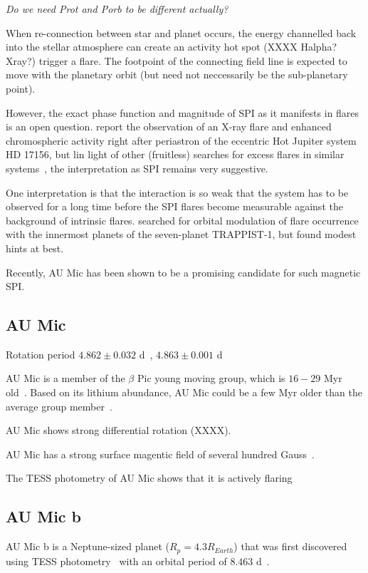 \documentclass[fleqn,usenatbib,letters]{mnras}%
\begin{document}
\textit{Do we need Prot and Porb to be different actually?}

When re-connection between star and planet occurs, the energy channelled back into the stellar atmosphere can create an activity hot spot (XXXX Halpha? Xray?) trigger a flare. The footpoint of the connecting field line is expected to move with the planetary orbit (but need not neccessarily be the sub-planetary point).



However, the exact phase function and magnitude of SPI as it manifests in flares is an open question. \citet{maggio2015} report the observation of an X-ray flare and enhanced chromospheric activity right after periastron of the eccentric Hot Jupiter system HD 17156, but lin light of other (fruitless) searches for excess flares in similar systems~\citep{figueira2016}, the interpretation as SPI remains very suggestive. 

One interpretation is that the interaction is so weak that the system has to be observed for a long time before the SPI flares become measurable against the background of intrinsic flares. \citet{fischer2019} searched for orbital modulation of flare occurrence with the innermost planets of the seven-planet TRAPPIST-1, but found modest hints at best. 

Recently, AU Mic has been shown to be a promising candidate for such magnetic SPI. 


\subsection{AU Mic}
Rotation period $4.862\pm 0.032$ d~\citep{martioli2021}, $4.863\pm 0.001$ d~\citep{plavchan2020}

AU Mic is a member of the $\beta$ Pic young moving group, which is $16-29$ Myr old~\citep{malo2014,binks2014,mamajek2014,bell2015,binks2016,shkolnik2017,miretroig2020}. Based on its lithium abundance, AU Mic could be a few Myr older than the average group member~\citep{malo2014}. 

AU Mic shows strong differential rotation (XXXX).

AU Mic has a strong surface magentic field of several hundred Gauss~\citep{klein2021}.

The TESS photometry of AU Mic shows that it is actively flaring~\citep{martioli2021}
\subsection{AU Mic b}
AU Mic b is a Neptune-sized planet ($R_p = 4.3R_{Earth}$) that was first discovered using TESS photometry~\citep{plavchan2020} with an orbital period of $8.463$ d~\citep{plavchan2020,martioli2021}.
\end{document}
